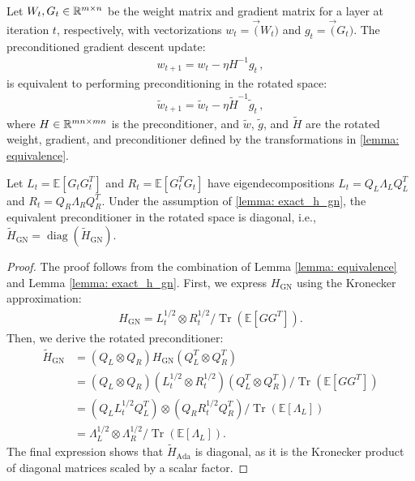 \begin{corollary} 
\label{corollary: rotated}
Let $W_t, G_t \in \mathbb{R}^{m \times n}$ be the weight matrix and gradient matrix for a layer at iteration $t$, respectively, with vectorizations $w_t = \Vec(W_t)$ and $g_t = \Vec(G_t)$. The preconditioned gradient descent update:
\begin{align}
w_{t+1} = w_t - \eta H^{-1}g_t\,,
\end{align}
is equivalent to performing preconditioning in the rotated space:
\begin{align}
\widetilde{w}_{t+1} = \widetilde{w}_t - \eta \widetilde{H}^{-1}\widetilde{g}_t\,,
\end{align}
where $H \in \mathbb{R}^{mn \times mn}$ is the preconditioner, and $\widetilde{w}$, $\widetilde{g}$, and $\widetilde{H}$ are the rotated weight, gradient, and preconditioner defined by the transformations in \cref{lemma: equivalence}. 
\end{corollary}

\begin{proposition}
\label{prop2}
Let $L_t = \mathbb{E}\left[G_tG_t^T\right]$ and $R_t = \mathbb{E}\left[G_t^T G_t\right]$ have eigendecompositions
$L_t = Q_L \Lambda_L Q_L^T$ and $R_t = Q_R \Lambda_R Q_R^T$. Under the assumption of \cref{lemma: exact_h_gn},
 the equivalent preconditioner in the rotated space is diagonal, i.e., $\widetilde{H}_{\text{GN}} = \operatorname{diag}(\widetilde{H}_{\text{GN}})$.
\end{proposition}

\begin{proof}
    The proof follows from the combination of Lemma \ref{lemma: equivalence} and Lemma \ref{lemma: exact_h_gn}. First, we express $H_{\text{GN}}$ using the Kronecker approximation:
\begin{align}
H_{\text{GN}} = L_t^{1/2} \otimes R_t^{1/2} / \operatorname{Tr}\left(\mathbb{E}\left[GG^T\right]\right).
\end{align}
Then, we derive the rotated preconditioner:
\begin{align*}
\widetilde{H}_{\text{GN}} &= \left(Q_L \otimes Q_R\right) H_{\text{GN}} \left(Q_L^T \otimes Q_R^T\right) \\
&= \left(Q_L \otimes Q_R\right) (L_t^{1/2} \otimes R_t^{1/2}) \left(Q_L^T \otimes Q_R^T\right) / \operatorname{Tr}\left(\mathbb{E}\left[GG^T\right]\right) \\
&= (Q_L L_t^{1/2} Q_L^T) \otimes (Q_R R_t^{1/2} Q_R^T) / \operatorname{Tr}\left(\mathbb{E}\left[\Lambda_L\right]\right) \\
&= \Lambda_L^{1/2} \otimes \Lambda_R^{1/2} / \operatorname{Tr}\left(\mathbb{E}\left[\Lambda_L\right]\right).
\end{align*}
The final expression shows that $\widetilde{H}_{\text{Ada}}$ is diagonal, as it is the Kronecker product of diagonal matrices scaled by a scalar factor.
\end{proof}



